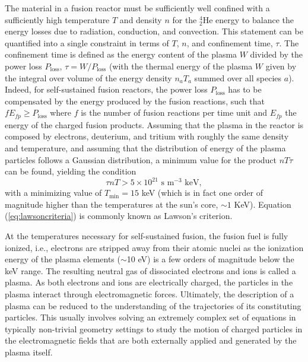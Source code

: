 The material in a fusion reactor must be sufficiently well confined with a sufficiently high temperature $T$ and density $n$ for the $^4_2 \text{He}$ energy to balance the energy losses due to radiation, conduction, and convection.
%
This statement can be quantified into a single constraint in terms of $T$, $n$, and confinement time, $\tau$.
%
The confinement time is defined as the energy content of the plasma $W$ divided by the power loss ${P_{\text{loss}}}$, $\tau = {W}/{P_{\text{loss}}}$ (with the thermal energy of the plasma $W$ given by the integral over volume of the energy density $n_a T_a$ summed over all species $a$).
%
Indeed, for self-sustained fusion reactors, the power loss ${P_{\text{loss}}}$ has to be compensated by the energy produced by the fusion reactions, such that $f E_{fp} \ge P_{\text{loss}}$ where $f$ is the number of fusion reactions per time unit and $E_{fp}$ the energy of the charged fusion products.
%
Assuming that the plasma in the reactor is composed by electrons, deuterium, and tritium with roughly the same density and temperature, and assuming that the distribution of energy of the plasma particles follows a Gaussian distribution, a minimum value for the product $n T \tau$ can be found, yielding the condition \citep{Wesson2004}
%
\begin{equation}
    \tau n T > 5 \times 10^{21}\text{~s m$^{-3}$ keV},
\label{eq:lawsoncriteria}
\end{equation}
%
with a minimizing value of $T_{\text{min}}=15$ keV (which is in fact one order of magnitude higher than the temperatures at the sun's core, $\sim 1$ KeV).
%
Equation (\ref{eq:lawsoncriteria}) is commonly known as Lawson's criterion.

At the temperatures necessary for self-sustained fusion, the fusion fuel is fully ionized, i.e., electrons are stripped away from their atomic nuclei as the ionization energy of the plasma elements ($\sim$10 eV) is a few orders of magnitude below the keV range.
%
The resulting neutral gas of dissociated electrons and ions is called a plasma.
%
As both electrons and ions are electrically charged, the particles in the plasma interact through electromagnetic forces.
%
Ultimately, the description of a plasma can be reduced to the understanding of the trajectories of its constituting particles.
%
This usually involves solving an extremely complex set of equations in typically non-trivial geometry settings to study the motion of charged particles in the electromagnetic fields that are both externally applied and generated by the plasma itself.


